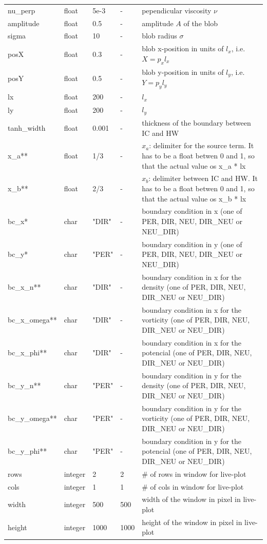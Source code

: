 \documentclass{hitec} %
\begin{document}
\begin{longtable}{llll>{\RaggedRight}p{7cm}}
nu\_perp     & float & 5e-3   & - & pependicular viscosity $\nu$ \\
amplitude  & float & 0.5    & - & amplitude $A$ of the blob \\
sigma      & float & 10     & - & blob radius $\sigma$ \\
posX       & float & 0.3    & - & blob x-position in units of $l_x$, i.e. $X = p_x l_x$\\
posY       & float & 0.5    & - & blob y-position in units of $l_y$, i.e. $Y = p_y l_y$ \\
lx         & float & 200    & - & $l_x$  \\
ly         & float & 200    & - & $l_y$  \\
tanh\_width & float & 0.001 & - & thickness of the boundary between IC and HW \\
x\_a**      & float & 1/3   & - & $x_a$: delimiter for the source term. It has to be a float betwen 0 and 1, so that the actual value os x\_a * lx \\
x\_b**      & float & 2/3   & - & $x_b$: delimiter between IC and HW. It has to be a float betwen 0 and 1, so that the actual value os x\_b * lx   \\
bc\_x*   & char & "DIR"      & - & boundary condition in x (one of PER, DIR, NEU, DIR\_NEU or NEU\_DIR) \\
bc\_y*   & char & "PER"      & - & boundary condition in y (one of PER, DIR, NEU, DIR\_NEU or NEU\_DIR) \\
bc\_x\_n**   & char & "DIR"      & - & boundary condition in x for the density (one of PER, DIR, NEU, DIR\_NEU or NEU\_DIR) \\
bc\_x\_omega**   & char & "DIR"      & - & boundary condition in x for the vorticity (one of PER, DIR, NEU, DIR\_NEU or NEU\_DIR) \\
bc\_x\_phi**   & char & "DIR"      & - & boundary condition in x for the potencial (one of PER, DIR, NEU, DIR\_NEU or NEU\_DIR) \\
bc\_y\_n**   & char & "PER"      & - & boundary condition in y for the density (one of PER, DIR, NEU, DIR\_NEU or NEU\_DIR) \\
bc\_y\_omega**   & char & "PER"      & - & boundary condition in y for the vorticity (one of PER, DIR, NEU, DIR\_NEU or NEU\_DIR) \\
bc\_y\_phi**   & char & "PER"      & - & boundary condition in y for the potencial (one of PER, DIR, NEU, DIR\_NEU or NEU\_DIR) \\

rows   & integer &  2 & 2 & \# of rows in window for live-plot \\
cols   & integer &  1 & 1 & \# of cols in window for live-plot \\
width  & integer & 500& 500 & width of the window in pixel in live-plot \\
height  & integer & 1000& 1000 & height of the window in pixel in live-plot \\
\bottomrule
\end{longtable}
\end{document}
